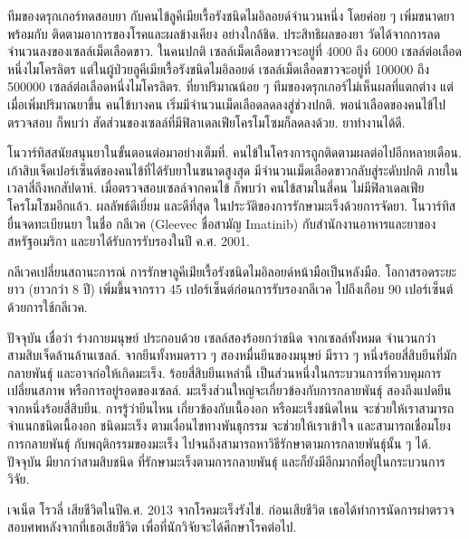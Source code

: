 {\begin{shaded}
	ทีมของดรุกเกอร์ทดสอบยา กับคนไข้ลูคีเมียเรื้อรังชนิดไมอิลอยด์จำนวนหนึ่ง
	โดยค่อย ๆ เพิ่มขนาดยา พร้อมกับ ติดตามอาการของโรคและผลข้างเคียง อย่างใกล้ชิด.
	ประสิทธิผลของยา วัดได้จากการลดจำนวนลงของเซลล์เม็ดเลือดขาว.
	ในคนปกติ เซลล์เม็ดเลือดขาวจะอยู่ที่ 4000 ถึง 6000 เซลล์ต่อเลือดหนึ่งไมโครลิตร 
	แต่ในผู้ป่วยลูคีเมียเรื้อรังชนิดไมอิลอยด์ เซลล์เม็ดเลือดขาวจะอยู่ที่ 100000 ถึง 500000 เซลล์ต่อเลือดหนึ่งไมโครลิตร.
	ที่ยาปริมาณน้อย ๆ ทีมของดรุกเกอร์ไม่เห็นผลที่แตกต่าง
	แต่เมื่อเพิ่มปริมาณยาขึ้น คนไข้บางคน เริ่มมีจำนวนเม็ดเลือดลดลงสู่ช่วงปกติ.
	พอนำเลือดของคนไข้ไปตรวจสอบ ก็พบว่า
	สัดส่วนของเซลล์ที่มีฟิลาเดลเฟียโครโมโซมก็ลดลงด้วย.
	ยาทำงานได้ดี.

	โนวาร์ทิสสนัยสนุนยาในขั้นตอนต่อมาอย่างเต็มที่.
	คนไข้ในโครงการถูกติดตามผลต่อไปอีกหลายเดือน.
	เก้าสิบเจ็ดเปอร์เซ็นต์ของคนไข้ที่ได้รับยาในขนาดสูงสุด มีจำนวนเม็ดเลือดขาวกลับสู่ระดับปกติ ภายในเวลาสี่ถึงหกสัปดาห์.
เมื่อตรวจสอบเซลล์จากคนไข้ ก็พบว่า
คนไข้สามในสี่คน ไม่มีฟิลาเดลเฟียโครโมโซมอีกแล้ว.
	ผลลัพธ์ดีเยี่ยม และดีที่สุด ในประวัติของการรักษามะเร็งด้วยการจัดยา.
	โนวาร์ทิสยื่นจดทะเบียนยา ในชื่อ กลีเวค (Gleevec ชื่อสามัญ  Imatinib) กับสำนักงานอาหารและยาของสหรัฐอเมริกา
	และยาได้รับการรับรองในปี ค.ศ. 2001.
	
	กลีเวคเปลี่ยนสถานะการณ์ การรักษาลูคีเม่ียเรื้อรังชนิดไมอิลอยด์หน้ามือเป็นหลังมือ.
	โอกาสรอดระยะยาว (ยาวกว่า 8 ปี) เพิ่มขึ้นจากราว 45 เปอร์เซ็นต์ก่อนการรับรองกลีเวค ไปถึงเกือบ 90 เปอร์เซ็นต์ด้วยการใช้กลีเวค.
	
	ปัจจุบัน เชื่อว่า ร่างกายมนุษย์ ประกอบด้วย	เซลล์สองร้อยกว่าชนิด จากเซลล์ทั้งหมด
	จำนวนกว่าสามสิบเจ็ดล้านล้านเซลล์.
	จากยีนทั้งหมดราว ๆ สองหมื่นยีนของมนุษย์
	มีราว ๆ หนึ่งร้อยสี่สิบยีนที่มักกลายพันธุ์ และอาจก่อให้เกิดมะเร็ง.
	ร้อยสี่สิบยีนเหล่านี้ เป็นส่วนหนึ่งในกระบวนการที่ควบคุมการเปลี่ยนสภาพ หรือการอยู่รอดของเซลล์.
	มะเร็งส่วนใหญ่จะเกี่ยวข้องกับการกลายพันธุ์ สองถึงแปดยีน จากหนึ่งร้อยสี่สิบยีน.
	การรู้ว่ายีนไหน เกี่ยวข้องกับเนื้องอก หรือมะเร็งชนิดไหน จะช่วยให้เราสามารถจำแนกชนิดเนื้องอก ชนิดมะเร็ง ตามเงื่อนไขทางพันธุกรรม
	จะช่วยให้เราเข้าใจ และสามารถเชื่อมโยงการกลายพันธุ์ กับพฤติกรรมของมะเร็ง ไปจนถึงสามารถหาวิธีรักษาตามการกลายพันธุ์นั้น ๆ ได้.
	ปัจจุบัน มียากว่าสามสิบชนิด ที่รักษามะเร็งตามการกลายพันธุ์
	และก็ยังมีอีกมากที่อยู่ในกระบวนการวิจัย.
	
	เจเน็ต โรวลี่ เสียชีวิตในปีค.ศ. 2013 จากโรคมะเร็งรังไข่.
	ก่อนเสียชีวิต เธอได้ทำการนัดการผ่าตรวจสอบศพหลังจากที่เธอเสียชีวิต เพื่อที่นักวิจัยจะได้ศึกษาโรคต่อไป.
		

\end{shaded}}
